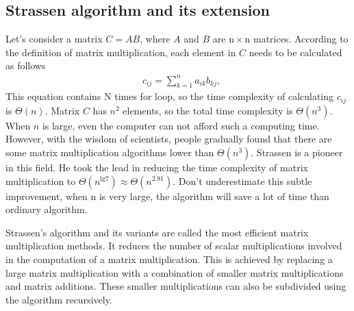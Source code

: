 \documentclass[journal]{IEEEtran}
\begin{document}
\subsection{Strassen algorithm and its extension}
Let's consider a matrix $C=AB$, where $A$ and $B$ are $\mathrm{n}\times\mathrm{n}$ matrices.
According to the definition of matrix multiplication, each element in $C$ needs to be calculated as follows
\begin{align}
&c_{ij}=\sum_{k=1}^{n}a_{ik}b_{kj},\label{cij}
\end{align}
This equation contains N times for loop, so the time complexity of calculating $c_{ij}$ is $\Theta(n)$.
Matrix $C$ has $n^2$ elements, so the total time complexity is $\Theta(n^3)$. 
When $n$ is large, even the computer can not afford such a computing time.
However, with the wisdom of scientists, people gradually found that there are some matrix multiplication algorithms lower than $\Theta(n^3)$.
Strassen is a pioneer in this field.
He took the lead in reducing the time complexity of matrix multiplication to $\Theta(n^{\mathrm{lg}7})\approx \Theta(n^{2.81})$.
Don't underestimate this subtle improvement, when n is very large, the algorithm will save a lot of time than ordinary algorithm.


Strassen's algorithm and its variants are called the most efficient matrix multiplication methods.
It reduces the number of scalar multiplications involved in the computation of a matrix multiplication. 
This is achieved by replacing a large matrix multiplication with a combination of smaller matrix multiplications and matrix additions.
These smaller multiplications can also be subdivided using the algorithm recursively.
\end{document}
